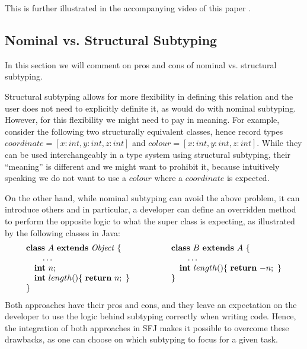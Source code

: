 \documentclass[runningheads]{llncs}
\begin{document}
This is further illustrated in the accompanying video of this paper \cite{UD20}.

\subsection{Nominal vs. Structural Subtyping}

In this section we will comment on pros and cons of nominal vs. structural subtyping.

Structural subtyping allows for more flexibility in defining this relation and the user does not need to explicitly definite it, as would do with nominal subtyping.
However, for this flexibility we might need to pay in meaning.
For example, consider the following two structurally equivalent classes, hence record types
$coordinate = [x:int, y:int, z:int]$ and $colour = [x:int, y:int, z:int]$.
While they can be used interchangeably in a type system using structural subtyping, their ``meaning'' is different and we might want to prohibit it, because intuitively speaking we do not want to use a $colour$ where a $coordinate$ is expected.

On the other hand, while nominal subtyping can avoid the above problem, it can introduce others and in particular, a developer can define an overridden method to perform the opposite logic to what the super class is expecting, as illustrated by the following classes in Java:
\begin{equation*}
    \begin{array}{ll}
        \mathbf{class} \  A \ \mathbf{extends }\  \mathit{Object}\ \{
         &
            \qquad
            \mathbf{class} \  B \ \mathbf{extends }\  A\ \{
                \\
               \qquad \ldots \qquad
         &
                \qquad\qquad \ldots
                \\
                \quad \textbf{int}\ n;\qquad
         &
                \qquad\quad \textbf{int}\ length()\{\ \mathbf{return}\ {-n};\ \}
                \\
                \quad \textbf{int}\ length()\{\ \mathbf{return}\ {n};\ \}\qquad
         &
                \qquad\}
                \\   \}
    \end{array}
\end{equation*}
Both approaches have their pros and cons, and they leave an expectation on the developer to use the logic behind subtyping correctly when writing code. Hence, the integration of both approaches in SFJ makes it possible to  overcome these drawbacks, as one can choose on which subtyping to focus for a given task.
\end{document}
